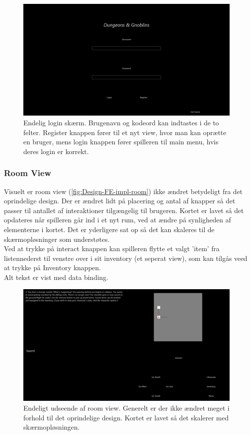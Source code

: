 \begin{figure}[h]
\centering
\includegraphics[width = \textwidth]{02-Body/Images/login_final.PNG}
\caption{Endelig login skærm. Brugenavn og kodeord kan indtastes i de to felter. Register knappen fører til et nyt view, hvor man kan oprætte en bruger, mens login knappen fører spilleren til main menu, hvis deres login er korrekt.}
\label{fig:Design-FE-impl-login}
\end{figure}

\subsubsection{Room View}

Visuelt er room view (\autoref{fig:Design-FE-impl-room}) ikke ændret betydeligt fra det oprindelige design. Der er ændret lidt på placering og antal af knapper så det passer til antallet af interaktioner tilgængelig til brugeren. Kortet er lavet så det  opdateres når spilleren går ind i et nyt rum, ved at ændre på synligheden af elementerne i kortet. Det er yderligere sat op så det kan skaleres til de skærmopløsninger som understøtes.\\
Ved at trykke på interact knappen kan spilleren flytte et valgt 'item' fra listennederst til venstre over i sit inventory (et seperat view), som kan tilgås veed at trykke på Inventory knappen.\\
Alt tekst er vist med data binding.

\begin{figure}[h]
\centering
\includegraphics[width = \textwidth]{02-Body/Images/room_final.PNG}
\caption{Endeligt udseende af room view. Generelt er der ikke ændret meget i forhold til det oprindelige design. Kortet er lavet så det skalerer med skærmopløsningen.}
\label{fig:Design-FE-impl-room}
\end{figure}

